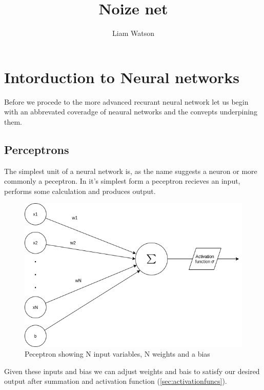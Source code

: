 \documentclass{article}
\title{Noize net}
\author{Liam Watson}
\begin{document}
\maketitle

\section{Intorduction to Neural networks}
\label{sec:intro}
Before we procede to the more advanced recurant neural network let us begin with an abbrevated coveradge of neaural networks and the convepts underpining them. 
\subsection{Perceptrons}
\label{sec:peceptrons}
The simplest unit of a neural network is, as the name suggests a neuron or more commonly a peceptron. In it's simplest form a peceptron recieves an input, performs some calculation and produces output.
\begin{figure}[h]
\caption{Peceptron showing N input variables, N weights and a bias}
\includegraphics[scale=0.5]{peceptron.png}
\end{figure}
Given these inputs and bias we can adjust weights and bais to satisfy our desired output after summation and activation function (\ref{sec:activationfuncs}). 
\end{document}

